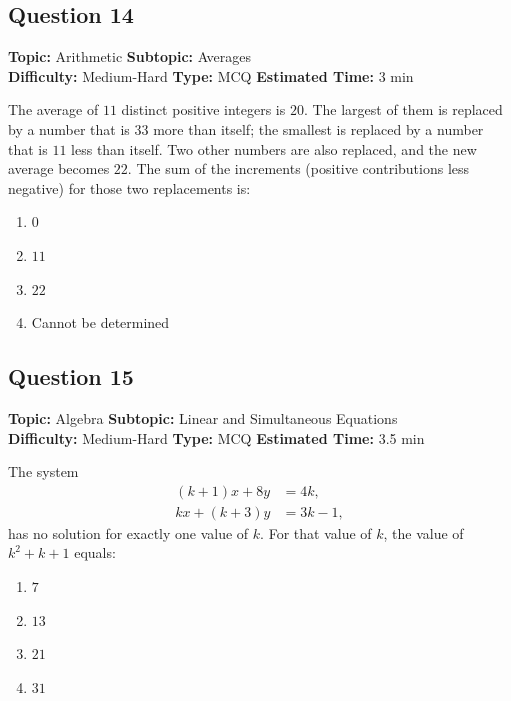 \documentclass[11pt]{article}
\begin{document}
\subsection*{Question 14}
\textbf{Topic:} Arithmetic \quad \textbf{Subtopic:} Averages \\
\textbf{Difficulty:} Medium-Hard \quad \textbf{Type:} MCQ \quad \textbf{Estimated Time:} 3 min

\begin{tcolorbox}
The average of \(11\) distinct positive integers is \(20\). The largest of them is replaced by a number that is \(33\) more than itself; the smallest is replaced by a number that is \(11\) less than itself. Two other numbers are also replaced, and the new average becomes \(22\). The sum of the increments (positive contributions less negative) for those two replacements is:
\end{tcolorbox}

\begin{enumerate}[label=(\Alph*)]
    \item \(0\)
    \item \(11\)
    \item \(22\)
    \item Cannot be determined
\end{enumerate}

\subsection*{Question 15}
\textbf{Topic:} Algebra \quad \textbf{Subtopic:} Linear and Simultaneous Equations \\
\textbf{Difficulty:} Medium-Hard \quad \textbf{Type:} MCQ \quad \textbf{Estimated Time:} 3.5 min

\begin{tcolorbox}
The system
\[
\begin{aligned}
(k+1)x + 8y &= 4k,\\
kx + (k+3)y &= 3k - 1,
\end{aligned}
\]
has no solution for exactly one value of \(k\). For that value of \(k\), the value of \(k^2 + k + 1\) equals:
\end{tcolorbox}

\begin{enumerate}[label=(\Alph*)]
    \item \(7\)
    \item \(13\)
    \item \(21\)
    \item \(31\)
\end{enumerate}
\end{document}
